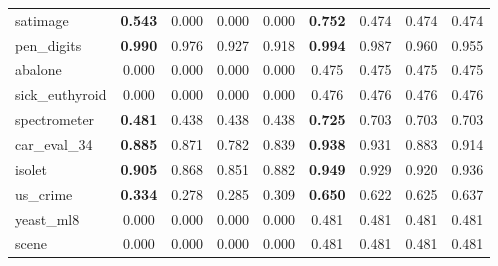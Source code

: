 \begin{figure}[ht]
\begin{tabular}{p{22mm}|*4{p{14mm}}|*4{p{14mm}}}
        satimage&\multicolumn{1}{c}{\textbf{0.543}}&\multicolumn{1}{c}{0.000}&\multicolumn{1}{c}{0.000}&\multicolumn{1}{c|}{0.000}&\multicolumn{1}{c}{\textbf{0.752}}&\multicolumn{1}{c}{0.474}&\multicolumn{1}{c}{0.474}&\multicolumn{1}{c}{0.474}\\
        pen\_digits&\multicolumn{1}{c}{\textbf{0.990}}&\multicolumn{1}{c}{0.976}&\multicolumn{1}{c}{0.927}&\multicolumn{1}{c|}{0.918}&\multicolumn{1}{c}{\textbf{0.994}}&\multicolumn{1}{c}{0.987}&\multicolumn{1}{c}{0.960}&\multicolumn{1}{c}{0.955}\\
        abalone&\multicolumn{1}{c}{0.000}&\multicolumn{1}{c}{0.000}&\multicolumn{1}{c}{0.000}&\multicolumn{1}{c|}{0.000}&\multicolumn{1}{c}{0.475}&\multicolumn{1}{c}{0.475}&\multicolumn{1}{c}{0.475}&\multicolumn{1}{c}{0.475}\\
        sick\_euthyroid&\multicolumn{1}{c}{0.000}&\multicolumn{1}{c}{0.000}&\multicolumn{1}{c}{0.000}&\multicolumn{1}{c|}{0.000}&\multicolumn{1}{c}{0.476}&\multicolumn{1}{c}{0.476}&\multicolumn{1}{c}{0.476}&\multicolumn{1}{c}{0.476}\\
        spectrometer&\multicolumn{1}{c}{\textbf{0.481}}&\multicolumn{1}{c}{0.438}&\multicolumn{1}{c}{0.438}&\multicolumn{1}{c|}{0.438}&\multicolumn{1}{c}{\textbf{0.725}}&\multicolumn{1}{c}{0.703}&\multicolumn{1}{c}{0.703}&\multicolumn{1}{c}{0.703}\\
        car\_eval\_34&\multicolumn{1}{c}{\textbf{0.885}}&\multicolumn{1}{c}{0.871}&\multicolumn{1}{c}{0.782}&\multicolumn{1}{c|}{0.839}&\multicolumn{1}{c}{\textbf{0.938}}&\multicolumn{1}{c}{0.931}&\multicolumn{1}{c}{0.883}&\multicolumn{1}{c}{0.914}\\
        isolet&\multicolumn{1}{c}{\textbf{0.905}}&\multicolumn{1}{c}{0.868}&\multicolumn{1}{c}{0.851}&\multicolumn{1}{c|}{0.882}&\multicolumn{1}{c}{\textbf{0.949}}&\multicolumn{1}{c}{0.929}&\multicolumn{1}{c}{0.920}&\multicolumn{1}{c}{0.936}\\
        us\_crime&\multicolumn{1}{c}{\textbf{0.334}}&\multicolumn{1}{c}{0.278}&\multicolumn{1}{c}{0.285}&\multicolumn{1}{c|}{0.309}&\multicolumn{1}{c}{\textbf{0.650}}&\multicolumn{1}{c}{0.622}&\multicolumn{1}{c}{0.625}&\multicolumn{1}{c}{0.637}\\
        yeast\_ml8&\multicolumn{1}{c}{0.000}&\multicolumn{1}{c}{0.000}&\multicolumn{1}{c}{0.000}&\multicolumn{1}{c|}{0.000}&\multicolumn{1}{c}{0.481}&\multicolumn{1}{c}{0.481}&\multicolumn{1}{c}{0.481}&\multicolumn{1}{c}{0.481}\\
        scene&\multicolumn{1}{c}{0.000}&\multicolumn{1}{c}{0.000}&\multicolumn{1}{c}{0.000}&\multicolumn{1}{c|}{0.000}&\multicolumn{1}{c}{0.481}&\multicolumn{1}{c}{0.481}&\multicolumn{1}{c}{0.481}&\multicolumn{1}{c}{0.481}\\

\end{tabular}
\end{figure}
